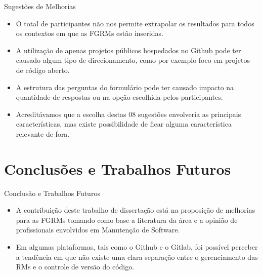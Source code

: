 \documentclass[t,14pt,mathserif]{beamer}
\begin{document}
\begin{frame}{Sugestões de Melhorias}

    \begin{itemize}
        \item O total de participantes não nos permite extrapolar os resultados
            para todos os contextos em que as FGRMs estão inseridas.

        \item A utilização de apenas projetos públicos hospedados no Github pode
            ter causado algum tipo de direcionamento, como por exemplo foco em
            projetos de código aberto.

        \item A estrutura das perguntas do formulário pode ter causado impacto
            na quantidade de respostas ou na opção escolhida pelos
            participantes.

        \item Acreditávamos que a escolha destas 08 sugestões envolveria as
            principais características, mas existe possibilidade de ficar alguma
            característica relevante de fora.
    \end{itemize}

\end{frame}

\section{Conclusões e Trabalhos Futuros}

\begin{frame}{Conclusão e Trabalhos Futuros}
    \begin{itemize}
        \item A contribuição deste trabalho de dissertação está na proposição de
            melhorias para as FGRMs tomando como base a literatura da área e a
            opinião de profissionais envolvidos em Manutenção de Software.

        \item Em algumas plataformas, tais como o Github e o Gitlab, foi
            possível perceber a tendência em que não existe uma clara separação
            entre o gerenciamento das RMs e o controle de versão do código.

    \end{itemize}
\end{frame}
\end{document}
